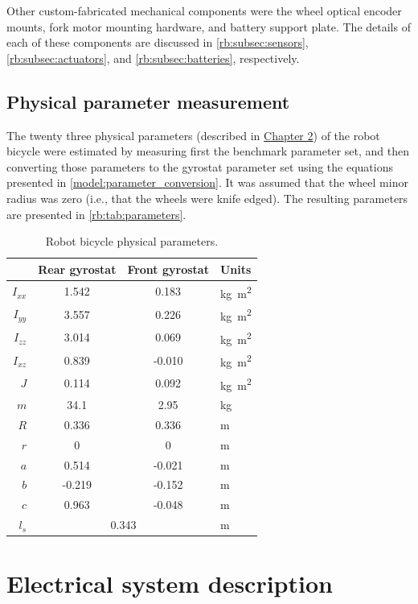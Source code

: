 Other custom-fabricated mechanical components were the wheel optical encoder
mounts, fork motor mounting hardware, and battery support plate. The details of
each of these components are discussed in \ref{rb:subsec:sensors},
\ref{rb:subsec:actuators}, and \ref{rb:subsec:batteries}, respectively.

\subsection{Physical parameter measurement} \label{rb:subsec:parameters}
The twenty three physical parameters (described in \hyperref[chapter2]{Chapter 2}) of the
robot bicycle were estimated by measuring first the benchmark parameter set,
and then converting those parameters to the gyrostat parameter set using the
equations presented in \autoref{model:parameter_conversion}. It was assumed
that the wheel minor radius was zero (i.e., that the wheels were knife edged).
The resulting parameters are presented in \autoref{rb:tab:parameters}.
\begin{table}[htbp]
  \centering
  \begin{tabular}{rccl}
    \toprule
    & {Rear gyrostat} & {Front gyrostat} & {Units} \\
    \midrule
    $I_{xx}$ &  1.542 &   0.183 & \si{\kg\m\squared} \\
    $I_{yy}$ &  3.557 &   0.226 & \si{\kg\m\squared} \\
    $I_{zz}$ &  3.014 &   0.069 & \si{\kg\m\squared} \\
    $I_{xz}$ &  0.839 &  -0.010 & \si{\kg\m\squared} \\
         $J$ &  0.114 &   0.092 & \si{\kg\m\squared} \\
         $m$ & 34.1   &   2.95  & \si{\kg}     \\
         $R$ &  0.336 &   0.336 & \si{\m}      \\
         $r$ &  0     &   0     & \si{\m}\\
         $a$ &  0.514 &  -0.021 & \si{\m}\\
         $b$ & -0.219 &  -0.152 & \si{\m}\\
         $c$ &  0.963 &  -0.048 & \si{\m}\\
         $l_s$ & \multicolumn{2}{c}{0.343} &  \si{\m} \\
    \bottomrule
  \end{tabular}
  \caption{Robot bicycle physical parameters.}
  \label{rb:tab:parameters}
\end{table}
\section{Electrical system description} \label{rb:sec:elec}
